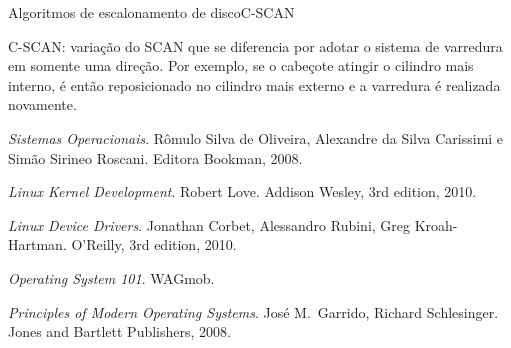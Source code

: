 \begin{frame}{Algoritmos de escalonamento de disco}{C-SCAN}

  \alert{C-SCAN}: variação do SCAN que se diferencia por adotar
  o sistema de varredura em somente uma direção. Por exemplo, se o
  cabeçote atingir o cilindro mais interno, é então reposicionado
  no cilindro mais externo e a varredura é realizada novamente.


  \bigskip


\end{frame}


\begin{frame}
  
  \begin{thebibliography}{5}
    {\em Sistemas Operacionais}.
    \newblock Rômulo Silva de Oliveira, Alexandre da Silva Carissimi e 
    Simão Sirineo Roscani.
    \newblock Editora Bookman, 2008.
  
    {\em Linux Kernel Development}.
    \newblock Robert Love.
    \newblock Addison Wesley, 3rd edition, 2010.

    {\em Linux Device Drivers}.
    \newblock Jonathan Corbet, Alessandro Rubini, Greg Kroah-Hartman.
    \newblock O'Reilly, 3rd edition, 2010.

    {\em Operating System 101}.
    \newblock WAGmob.

    {\em Principles of Modern Operating Systems}.
    \newblock José M.\ Garrido, Richard Schlesinger.
    \newblock Jones and Bartlett Publishers, 2008.

  \end{thebibliography}

\end{frame}


